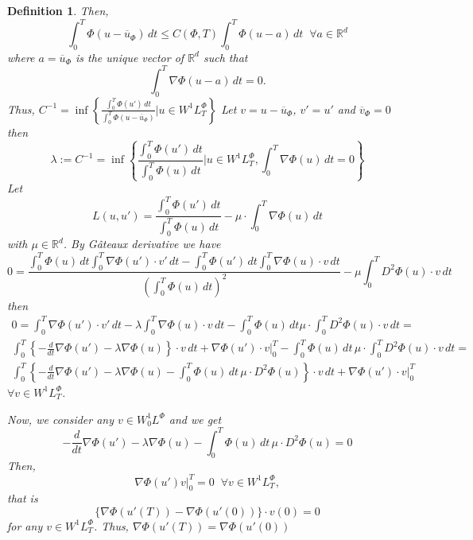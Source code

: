 \documentclass[twoside]{article}
\newtheorem{defi}[thm]{Definition}
\theoremstyle{remark}
\newcommand{\lphi}{L^{\Phi}}
\newcommand{\wphit}{W^{1}\lphi_T}
\newcommand{\rr}{\mathbb{R}}
\renewcommand{\leq}{\leqslant}
\begin{document}
\begin{defi}
Then, 
\begin{equation}
\int_0^T \Phi(u-\overline{u}_{\Phi})\,dt\leq
C(\Phi, T) \int_0^T\Phi(u-a)\,dt\;\; \forall a  \in \rr^d 
\end{equation}
where $a=\overline{u}_{\Phi}$ is the unique vector of $\rr^d$ such that
\begin{equation}
\int_0^T \nabla \Phi(u-a)\,dt=0.
\end{equation}  
Thus, 
$C^{-1}=\inf\left\{
\frac{\int_0^T \Phi(u')\,dt}{\int_0^T \Phi(u-\overline{u}_{\Phi})}| u \in \wphit
\right\}$
Let $v=u-\overline{u}_{\Phi}$, $v'=u'$ and $\overline{v}_{\Phi}=0$ then
\begin{equation}
\lambda:=C^{-1}=\inf \left\{
\frac{\int_0^T \Phi(u')\,dt}{\int_0^T \Phi(u)\,dt}|u \in \wphit, \int_0^T \nabla \Phi(u)\,dt=0
\right\}
\end{equation}
Let 
\begin{equation}
L(u,u')=\frac{\int_0^T \Phi(u')\,dt}{\int_0^T \Phi(u)\,dt}-\mu \cdot\int_0^T \nabla \Phi(u)\,dt
\end{equation}
with $\mu \in \rr^d$. 
By G\^ateaux derivative we have
\begin{equation}
0=\frac{\int_0^T \Phi(u)\,dt \int_0^T \nabla\Phi(u')\cdot v'\,dt-
\int_0^T \Phi(u')\,dt \int_0^T \nabla \Phi(u)\cdot v\,dt}{(\int_0^T \Phi(u)\,dt)^2}-\mu \int_0^T D^2\Phi(u)\cdot v \,dt
\end{equation}
then 
\begin{equation}
\begin{split}
0=\int_0^T \nabla\Phi(u')\cdot v'\,dt-\lambda \int_0^T \nabla \Phi(u)\cdot v\,dt-
\int_0^T \Phi(u)\,dt \mu \cdot\int_0^T D^2\Phi(u)\cdot v \,dt=
\\
\int_0^T \left\{
-\frac{d}{dt}\nabla\Phi(u')-\lambda \nabla\Phi(u)
\right\} \cdot v\,dt+\nabla\Phi(u')\cdot v|_0^T-\int_0^T \Phi(u)\,dt\, \mu \cdot\int_0^T D^2\Phi(u)\cdot v \,dt=
\\
\int_0^T \left\{
-\frac{d}{dt}\nabla\Phi(u')-\lambda \nabla\Phi(u)
 -\int_0^T \Phi(u)\,dt \,\mu \cdot D^2\Phi(u)\right\}\cdot v \,dt+\nabla\Phi(u')\cdot v|_0^T
\end{split}
\end{equation}
$\forall v \in \wphit$. 

Now, we consider any $v \in W_0^1L^{\Phi}$ and we get
\begin{equation}\label{eq:ed-phi-aniso}
-\frac{d}{dt}\nabla\Phi(u')-\lambda \nabla\Phi(u)
 -\int_0^T \Phi(u)\,dt\, \mu \cdot D^2\Phi(u)=0
\end{equation}
Then, 
\[
 \nabla\Phi(u') v|_0^T=0\;\;\forall v \in \wphit,
\]
that is
\[
 \{\nabla\Phi(u'(T))-\nabla\Phi(u'(0))\}\cdot v(0)=0
\]
for any $v \in \wphit$. 
Thus,  $\nabla\Phi(u'(T))=\nabla\Phi(u'(0))$


\end{defi}
\end{document}
